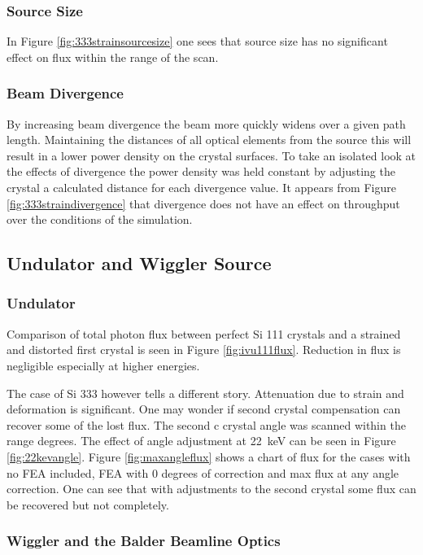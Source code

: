 \documentclass[preprint]{iucr}              %
\begin{document}
\subsubsection{Source Size}
In Figure \ref{fig:333strainsourcesize} one sees that source size has no significant effect on flux within the range of the scan.

\subsubsection{Beam Divergence}
By increasing beam divergence the beam more quickly widens over a given path length. Maintaining the distances of all optical elements from the source this will result in a lower power density on the crystal surfaces. To take an isolated look at the effects of divergence the power density was held constant by adjusting the crystal a calculated distance for each divergence value. It appears from Figure \ref{fig:333straindivergence} that divergence does not have an effect on throughput over the conditions of the simulation.

\subsection{Undulator and Wiggler Source}\label{undulatorwiggler}

\subsubsection{Undulator}
Comparison of total photon flux between perfect Si 111 crystals and a strained and distorted first crystal is seen in Figure \ref{fig:ivu111flux}. Reduction in flux is negligible especially at higher energies.

The case of Si 333 however tells a different story. Attenuation due to strain and deformation is significant. One may wonder if second crystal compensation can recover some of the lost flux. The second c
crystal angle was scanned within the range  degrees. The effect of angle adjustment at 22~keV can be seen in Figure \ref{fig:22kevangle}. Figure \ref{fig:maxangleflux} shows a chart of flux for the cases with no FEA included, FEA with 0 degrees of correction and max flux at any angle correction. One can see that with adjustments to the second crystal some flux can be recovered but not completely.

\subsubsection{Wiggler and the Balder Beamline Optics}
\end{document}
